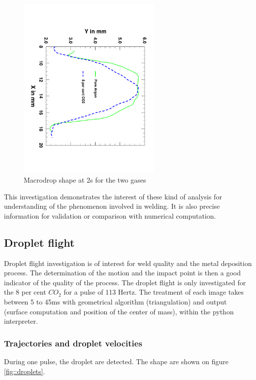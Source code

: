 \documentclass[12pt]{iopart}
\begin{document}
\begin{figure}[h!]
\centering    
\includegraphics[width=7cm,angle=90]{images/Comparaison_gazs_2s.pdf}
\caption{Macrodrop shape at 2s for the two gases}
\label{fig::comp_angles}
\end{figure}

This investigation demonstrates the interest of these kind of analysis for understanding of the phenomenon
involved in welding. It is also precise information for validation or comparison with numerical
computation.

\subsection{ Droplet flight}
Droplet flight investigation is of interest for weld quality and the metal deposition process.
The determination of the motion and the impact point is then a good indicator of the quality of the
process. The droplet flight is only investigated for the 8 per cent $CO_2$ for a pulse of 113 Hertz.
The treatment of each image takes between 5 to 45ms with geometrical algorithm (triangulation) and output
(surface computation and position of the center of mass), within the python interpreter.

\subsubsection{Trajectories and droplet velocities}
During one pulse, the droplet are detected. The shape are shown on figure \ref{fig::droplets}.
\end{document}
